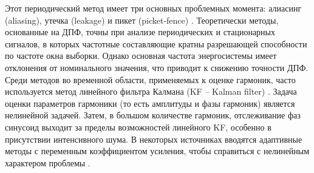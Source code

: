 

Этот периодический метод имеет три основных проблемных момента: алиасинг (aliasing), утечка (leakage) и пикет (picket-fence) \cite{4102347}.
Теоретически методы, основанные на ДПФ, точны при анализе периодических и стационарных сигналов, в которых частотные составляющие кратны разрешающей способности по частоте окна выборки. Однако основная частота энергосистемы имеет отклонения от номинального значения, что приводит к снижению точности ДПФ. Среди методов во временной области, применяемых к оценке гармоник, часто используется метод линейного фильтра Калмана (KF -- Kalman filter) \cite{dash1998fast}. 
Задача оценки параметров гармоники (то есть амплитуды и фазы гармоник) является нелинейной задачей. Затем, в большом количестве гармоник, отслеживание фаз синусоид выходит за пределы возможностей линейного KF, особенно в присутствии интенсивного шума. В некоторых источниках вводятся адаптивные методы с переменным коэффициентом усиления, чтобы справиться с нелинейным характером проблемы \cite{1413428, ray2012ensemble, dash1996harmonic, singh2016several}.



